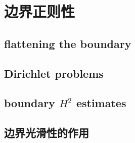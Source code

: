 \section{边界正则性}
\label{b2:sec:1603}


\subsection{flattening the boundary}
\label{b2:subsec:160301}

\subsection{Dirichlet problems}
\label{b2:subsec:160302}

\subsection{boundary \texorpdfstring{\(H^2\)}{H2} estimates}
\label{b2:subsec:160303}

\subsection{边界光滑性的作用}
\label{b2:subsec:160304}


